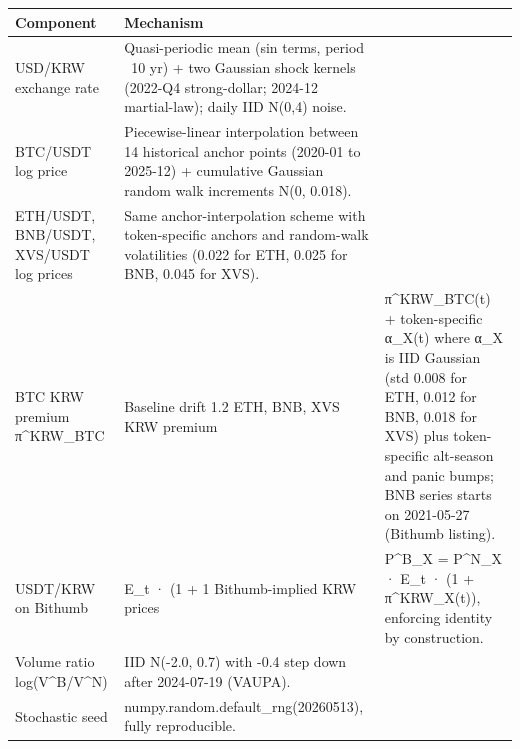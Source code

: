 \begin{tabular}{p{4.5cm}p{10.5cm}}
\toprule
Component & Mechanism \\
\midrule
USD/KRW exchange rate & Quasi-periodic mean (sin terms, period ~10 yr) + two Gaussian shock kernels (2022-Q4 strong-dollar; 2024-12 martial-law); daily IID N(0,4) noise. \\
BTC/USDT log price & Piecewise-linear interpolation between 14 historical anchor points (2020-01 to 2025-12) + cumulative Gaussian random walk increments N(0, 0.018). \\
ETH/USDT, BNB/USDT, XVS/USDT log prices & Same anchor-interpolation scheme with token-specific anchors and random-walk volatilities (0.022 for ETH, 0.025 for BNB, 0.045 for XVS). \\
BTC KRW premium π^KRW_BTC & Baseline drift 1.2%
ETH, BNB, XVS KRW premium & π^KRW_BTC(t) + token-specific α_X(t) where α_X is IID Gaussian (std 0.008 for ETH, 0.012 for BNB, 0.018 for XVS) plus token-specific alt-season and panic bumps; BNB series starts on 2021-05-27 (Bithumb listing). \\
USDT/KRW on Bithumb & E_t · (1 + 1%
Bithumb-implied KRW prices & P^B_X = P^N_X · E_t · (1 + π^KRW_X(t)), enforcing identity by construction. \\
Volume ratio log(V^B/V^N) & IID N(-2.0, 0.7) with -0.4 step down after 2024-07-19 (VAUPA). \\
Stochastic seed & numpy.random.default_rng(20260513), fully reproducible. \\
\bottomrule
\end{tabular}